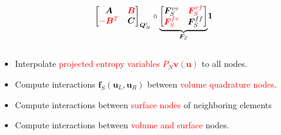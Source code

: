 \documentclass[compress]{beamer}
\theoremstyle{plain}
\renewcommand{\note}[1]{\textcolor{red}{{#1}}}
\begin{document}
{\begin{columns}
\begin{column}{.5\textwidth}
\[{{{\begin{bmatrix}
\bm{A} & \note{\bm{B}}\\
\note{-\bm{B}^T} & \bm{C}
\end{bmatrix}}_{\bm{Q}_N^i} \circ
\underbrace{\begin{bmatrix}
\bm{F}^{vv}_S & \note{\bm{F}^{vf}_S}\\
\note{\bm{F}^{fv}_S} & \bm{F}^{ff}_S
\end{bmatrix}}_{\bm{F}_S} } \bm{1}
}
\]
\end{column}
\end{columns}
\vspace{.5em}
\begin{itemize}
\item<1-> Interpolate \note{projected entropy variables $P_N \bm{v}(\bm{u})$} to all nodes.  
\item<2-> Compute interactions $\bm{f}_S(\bm{u}_L, \bm{u}_R)$ between \note{volume quadrature nodes}.
\item<3-> Compute interactions between \note{surface nodes} of neighboring elements
\item<4-> Compute interactions between \note{volume and surface} nodes.
\end{itemize} 
}
\end{document}
